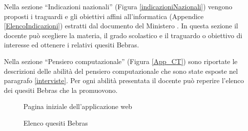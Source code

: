 \documentclass[12pt]{report}
\begin{document}
Nella sezione ``Indicazioni nazionali'' (Figura \ref{indicazioniNazionali}) vengono proposti i traguardi e gli obiettivi affini all'informatica (Appendice \ref{ElencoIndicazioni}) estratti dal documento del Ministero \cite{indicazioniNazionali}. In questa sezione il docente può scegliere la materia, il grado scolastico e il traguardo o obiettivo di interesse ed ottenere i relativi quesiti Bebras.

Nella sezione ``Pensiero computazionale'' (Figura \ref{App_CT}) sono riportate le descrizioni delle abilità del pensiero computazionale che sono state esposte nel paragrafo \ref{interviste}. Per ogni abilità presentata il docente può reperire l'elenco dei quesiti Bebras che la promuovono.

\begin{figure}[H]
	\centering
	\caption{Pagina iniziale dell'applicazione web}
	\label{App_homepage}
\end{figure}

\begin{figure}[H]
	\centering
	\caption{Elenco quesiti Bebras}
	\label{App_elencoQuesiti}
\end{figure}
\end{document}
